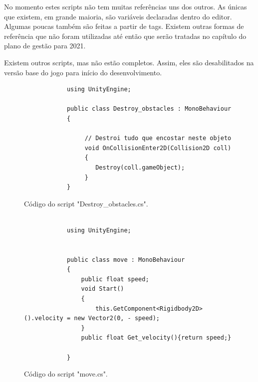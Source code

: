     No momento estes scripts não tem muitas referências uns dos outros.
    As únicas que existem, em grande maioria, são variáveis declaradas dentro do editor.
    Algumas poucas também são feitas a partir de tags.
    Existem outras formas de referência que não foram utilizadas até então que serão tratadas no capítulo do plano de gestão para 2021.

    Existem outros scripts, mas não estão completos. 
    Assim, eles são desabilitados na versão base do jogo para início do desenvolvimento.


    \begin{figure}[ht!]
        \centering
        \begin{lstlisting}
            using UnityEngine;

            public class Destroy_obstacles : MonoBehaviour
            {
                
                 // Destroi tudo que encostar neste objeto
                 void OnCollisionEnter2D(Collision2D coll) 
                 {
                    Destroy(coll.gameObject);
                 }
            }
        \end{lstlisting}
        \caption{Código do script "Destroy\_obstacles.cs".}
        \label{code:destruction_code}

    \end{figure}


    \begin{figure}[ht!]
        \centering
        \begin{lstlisting}
            
            using UnityEngine;


            public class move : MonoBehaviour
            {
                public float speed;
                void Start()
                {
                    this.GetComponent<Rigidbody2D>().velocity = new Vector2(0, - speed);
                }
                public float Get_velocity(){return speed;}
                
            }

        \end{lstlisting}
        \caption{Código do script "move.cs".}
        \label{code:move}

    \end{figure}


